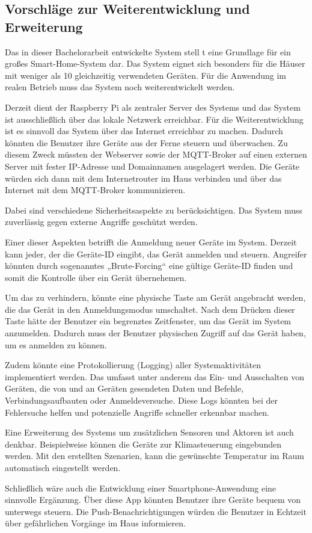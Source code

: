 \documentclass[12pt, letterpaper]{article}
\begin{document}
\subsection{Vorschläge zur Weiterentwicklung und Erweiterung}
\par Das in dieser Bachelorarbeit entwickelte System stell t eine Grundlage für ein großes Smart-Home-System dar. Das System eignet sich besonders für die Häuser mit weniger als 10 gleichzeitig verwendeten Geräten. Für die Anwendung im realen Betrieb muss das System noch weiterentwickelt werden.
\par Derzeit dient der Raspberry Pi als zentraler Server des Systems und das System ist ausschließlich über das lokale Netzwerk erreichbar. Für die Weiterentwicklung ist es sinnvoll das System über das Internet erreichbar zu machen. Dadurch könnten die Benutzer ihre Geräte aus der Ferne steuern und überwachen. Zu diesem Zweck müssten der Webserver sowie der MQTT-Broker auf einen externen Server mit fester IP-Adresse und Domainnamen ausgelagert werden. Die Geräte würden sich dann mit dem Internetrouter im Haus verbinden und über das Internet mit dem MQTT-Broker kommunizieren.
\par Dabei sind verschiedene Sicherheitsaspekte zu berücksichtigen. Das System muss zuverlässig gegen externe Angriffe geschützt werden. 
\par Einer dieser Aspekten betrifft die Anmeldung neuer Geräte im System. Derzeit kann jeder, der die Geräte-ID eingibt, das Gerät anmelden und steuern. Angreifer könnten durch sogenanntes „Brute-Forcing“ eine gültige Geräte-ID finden und somit die Kontrolle über ein Gerät übernehemen. 
\par Um das zu verhindern, könnte eine physische Taste am Gerät angebracht werden, die das Gerät in den Anmeldungsmodus umschaltet. Nach dem Drücken dieser Taste hätte der Benutzer ein begrenztes Zeitfenster, um das Gerät im System anzumelden. Dadurch muss der Benutzer physischen Zugriff auf das Gerät haben, um es anmelden zu können.
\par Zudem könnte eine Protokollierung (Logging) aller Systemaktivitäten implementiert werden. Das umfasst unter anderem das Ein- und Ausschalten von Geräten, die von und an Geräten gesendeten Daten und Befehle, Verbindungsaufbauten oder Anmeldeversuche. Diese Logs könnten bei der Fehlersuche helfen und potenzielle Angriffe schneller erkennbar machen.
\par Eine Erweiterung des Systems um zusätzlichen Sensoren und Aktoren ist auch denkbar. Beispielweise können die Geräte zur Klimasteuerung eingebunden werden. Mit den erstellten Szenarien, kann die gewünschte Temperatur im Raum automatisch eingestellt werden.
\par Schließlich wäre auch die Entwicklung einer Smartphone-Anwendung eine sinnvolle Ergänzung. Über diese App könnten Benutzer ihre Geräte bequem von unterwegs steuern. Die Push-Benachrichtigungen würden die Benutzer in Echtzeit über gefährlichen Vorgänge im Haus informieren.  
\end{document}
